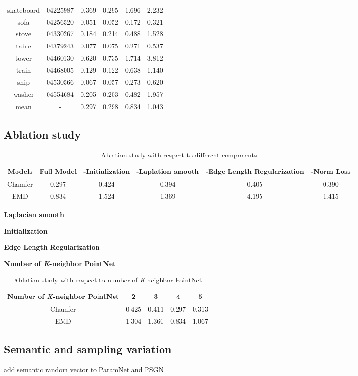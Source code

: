 \begin{table*}
\begin{tabular}{c c c c c c}
		skateboard & 04225987 & 0.369 & 0.295 & 1.696 & 2.232 \\
		sofa & 04256520 & 0.051 & 0.052 & 0.172 & 0.321 \\
		stove & 04330267 & 0.184 & 0.214 & 0.488 & 1.528 \\
		table & 04379243 & 0.077 & 0.075 & 0.271 & 0.537 \\
		tower & 04460130 & 0.620 & 0.735 & 1.714 & 3.812 \\
		train & 04468005 & 0.129 & 0.122 & 0.638 & 1.140 \\
		ship  & 04530566 & 0.067 & 0.057 & 0.273 & 0.620 \\
		washer &  04554684 & 0.205 & 0.203 & 0.482 & 1.957 \\
		mean   &     -     & 0.297 & 0.298 & 0.834 & 1.043
	\end{tabular}
\end{table*}

\subsection{Ablation study}
\begin{table*}
	\caption{Ablation study with respect to different components}
	\label{tab:ablation}
	\centering
	\begin{tabular}{c | c c c c c}
		Models &  Full Model  & -Initialization & -Laplation smooth & -Edge Length Regularization & -Norm Loss \\
		\hline
		Chamfer      & 0.297 & 0.424 & 0.394 & 0.405  & 0.390\\
		EMD			 & 0.834 & 1.524 & 1.369 & 4.195  & 1.415
	\end{tabular}
\end{table*}
\noindent\textbf{Laplacian smooth}

\noindent\textbf{Initialization}

\noindent\textbf{Edge Length Regularization}

\noindent\textbf{Number of \textit{K}-neighbor PointNet}
\begin{table}
	\caption{Ablation study with respect to number of \textit{K}-neighbor PointNet}
	\label{tab:pointnet}
	\centering
	\begin{tabular}{c | c c c c}
		Number of \textit{K}-neighbor PointNet &  2 & 3 & 4 & 5 \\
		\hline
		Chamfer      & 0.425 &  0.411 & 0.297 & 0.313 \\
		EMD			 & 1.304 &  1.360 & 0.834 & 1.067
	\end{tabular}
\end{table}
\subsection{Semantic and sampling variation}
add semantic random vector to ParamNet and PSGN\cite{PSGN}
